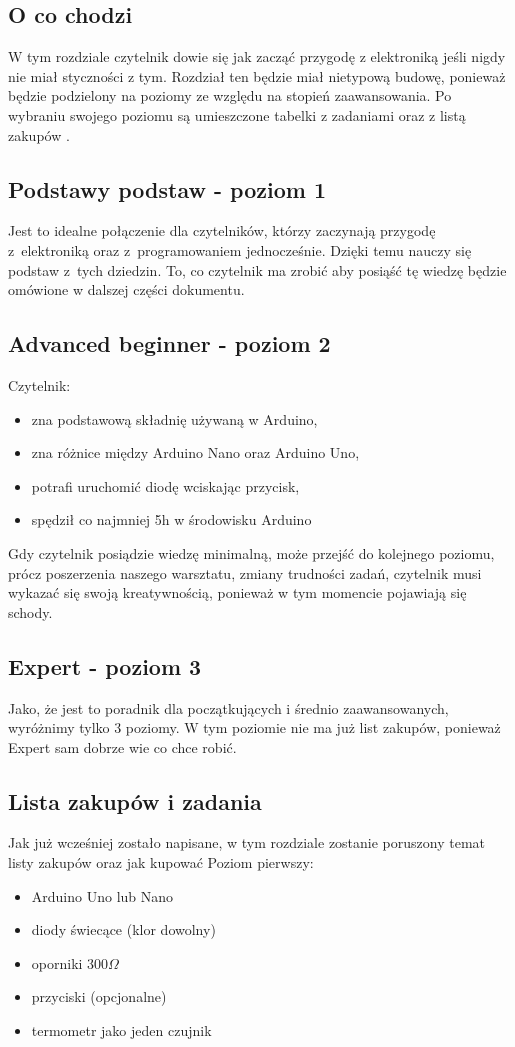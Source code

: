 \subsection{ O co chodzi }
W tym rozdziale czytelnik dowie się jak zacząć przygodę z elektroniką jeśli nigdy nie miał styczności z tym. Rozdział ten będzie miał
nietypową budowę, ponieważ będzie podzielony na poziomy ze względu na stopień zaawansowania. Po wybraniu swojego poziomu są umieszczone tabelki z zadaniami oraz z listą zakupów .
\subsection{Podstawy podstaw - poziom 1}
Jest to idealne połączenie dla czytelników, którzy zaczynają przygodę z~elektroniką oraz z~programowaniem jednocześnie. Dzięki temu nauczy się podstaw z~tych dziedzin. 
To, co czytelnik ma zrobić aby posiąść tę wiedzę będzie omówione w dalszej części dokumentu.
\subsection{Advanced beginner - poziom 2}
Czytelnik:
\begin{itemize}
\item zna podstawową składnię używaną w Arduino,
\item zna różnice między Arduino Nano oraz Arduino Uno,
\item potrafi uruchomić diodę wciskając przycisk,
\item spędził co najmniej 5h w środowisku Arduino
\end{itemize}

Gdy czytelnik posiądzie wiedzę minimalną, może przejść do kolejnego poziomu, prócz poszerzenia naszego warsztatu, zmiany trudności zadań, czytelnik musi wykazać się swoją kreatywnością, ponieważ w tym momencie pojawiają się schody.

\subsection{Expert - poziom 3}
Jako, że jest to poradnik dla początkujących i średnio zaawansowanych, wyróżnimy tylko 3 poziomy. W tym poziomie nie ma już list zakupów, ponieważ Expert sam dobrze wie co chce robić.
\subsection{Lista zakupów i zadania}
Jak już wcześniej zostało napisane, w tym rozdziale zostanie poruszony temat listy zakupów oraz jak kupować
Poziom pierwszy:
\begin{itemize}
\item Arduino Uno lub Nano
\item diody świecące (klor dowolny)
\item oporniki $300\Omega$
\item przyciski (opcjonalne)
\item termometr jako jeden czujnik
 \end{itemize}

